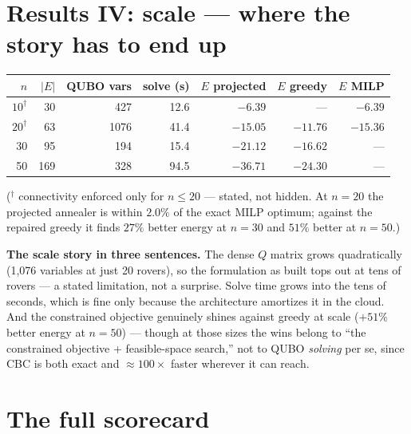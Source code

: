 \documentclass[11pt]{article}
\newenvironment{card}{%
  \def\FrameCommand{\fboxsep=8pt\fcolorbox{cardline}{cardbg}}%
  \MakeFramed{\advance\hsize-\width\FrameRestore}\noindent}{\endMakeFramed}
\begin{document}
\section{Results IV: scale --- where the story has to end up}

\begin{center}
\begin{tabular}{rrrrrrr}
\toprule
$n$ & $|E|$ & QUBO vars & solve (s) & $E$ projected & $E$ greedy & $E$ MILP \\
\midrule
$10^\dagger$ & 30 & 427 & 12.6 & $-6.39$ & --- & $-6.39$ \\
$20^\dagger$ & 63 & 1076 & 41.4 & $-15.05$ & $-11.76$ & $-15.36$ \\
30 & 95 & 194 & 15.4 & $-21.12$ & $-16.62$ & --- \\
50 & 169 & 328 & 94.5 & $-36.71$ & $-24.30$ & --- \\
\bottomrule
\end{tabular}
\end{center}
($^\dagger$ connectivity enforced only for $n \le 20$ --- stated, not
hidden. At $n{=}20$ the projected annealer is within $2.0\%$ of the exact
MILP optimum; against the repaired greedy it finds $27\%$ better energy at
$n{=}30$ and $51\%$ better at $n{=}50$.)

\begin{card}
\textbf{The scale story in three sentences.} The dense $Q$ matrix grows
quadratically (1{,}076 variables at just 20 rovers), so the formulation as
built tops out at tens of rovers --- a stated limitation, not a surprise.
Solve time grows into the tens of seconds, which is fine only because the
architecture amortizes it in the cloud. And the constrained objective
genuinely shines against greedy at scale ($+51\%$ better energy at
$n{=}50$) --- though at those sizes the wins belong to ``the constrained
objective + feasible-space search,'' not to QUBO \emph{solving} per se,
since CBC is both exact and $\approx100\times$ faster wherever it can
reach.
\end{card}

\section{The full scorecard}
\end{document}
